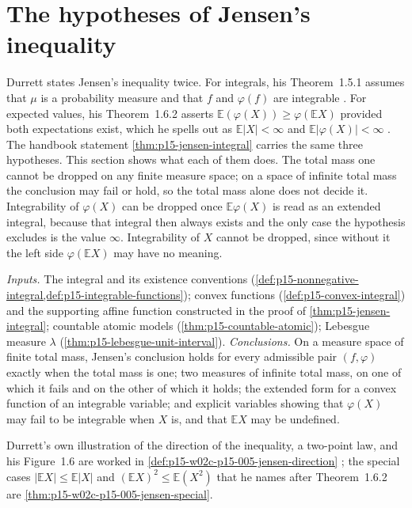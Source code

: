 \section{The hypotheses of Jensen's inequality}
\label{sec:p15-w02c-p15-001-jensen-hypotheses}

Durrett states Jensen's inequality twice. For integrals, his
Theorem~1.5.1 assumes that \(\mu\) is a probability measure and that
\(f\) and \(\varphi(f)\) are integrable
\cite[thm.~1.5.1, p.~25]{DurrettPTEAuthor2019}. For expected values,
his Theorem~1.6.2 asserts \(\mathbb E(\varphi(X))\geq\varphi(\mathbb EX)\)
provided both expectations exist, which he spells out as
\(\mathbb E|X|<\infty\) and \(\mathbb E|\varphi(X)|<\infty\)
\cite[thm.~1.6.2, p.~29]{DurrettPTEAuthor2019}. The handbook statement
\cref{thm:p15-jensen-integral} carries the same three hypotheses. This
section shows what each of them does. The total mass one cannot be dropped
on any finite measure space; on a space of infinite total mass the
conclusion may fail or hold, so the total mass alone does not decide it.
Integrability of \(\varphi(X)\) can be dropped once \(\mathbb E\varphi(X)\)
is read as an extended integral, because that integral then always
exists and the only case the hypothesis excludes is the value \(\infty\).
Integrability of \(X\) cannot be dropped, since without it the left side
\(\varphi(\mathbb EX)\) may have no meaning.

\emph{Inputs.} The integral and its existence conventions
(\cref{def:p15-nonnegative-integral,def:p15-integrable-functions});
convex functions (\cref{def:p15-convex-integral}) and the supporting
affine function constructed in the proof of
\cref{thm:p15-jensen-integral}; countable atomic models
(\cref{thm:p15-countable-atomic}); Lebesgue measure \(\lambda\)
(\cref{thm:p15-lebesgue-unit-interval}). \emph{Conclusions.} On a
measure space of finite total mass, Jensen's conclusion holds for every
admissible pair \((f,\varphi)\) exactly when the total mass is one; two
measures of infinite total mass, on one of which it fails and on the
other of which it holds; the extended form for a convex function of an
integrable variable; and explicit variables showing that \(\varphi(X)\)
may fail to be integrable when \(X\) is, and that \(\mathbb EX\) may be
undefined.

Durrett's own illustration of the direction of the inequality, a
two-point law, and his Figure~1.6 are worked in
\cref{def:p15-w02c-p15-005-jensen-direction}
\cite[pp.~29--30]{DurrettPTEAuthor2019}; the special cases
\(|\mathbb EX|\leq\mathbb E|X|\) and
\((\mathbb EX)^2\leq\mathbb E(X^2)\) that he names after
Theorem~1.6.2 are \cref{thm:p15-w02c-p15-005-jensen-special}.

